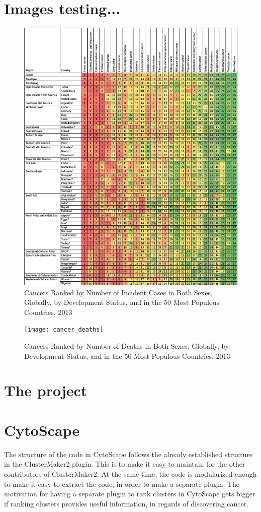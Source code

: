 \documentclass[UKenglish]{ifimaster}
\begin{document}
\part{Images testing...}
\begin{figure}[h]
    \caption{Cancers Ranked by Number of Incident Cases in Both Sexes, Globally, by Development Status, and in the 50
            Most Populous Countries, 2013}
    \includegraphics{cancer_incidents}
\end{figure}

\begin{figure}[h]
    \caption{Cancers Ranked by Number of Deaths in Both Sexes, Globally, by Development Status, and in the 50 Most
            Populous Countries, 2013}
    \texttt{[image: cancer\_deaths]}
\end{figure}

\part{The project}
\part{CytoScape} %
The structure of the code in CytoScape follows the already established structure in the ClusterMaker2 plugin. This is to
make it easy to maintain for the other contributors of ClusterMaker2. At the same time, the code is modularized enough
to make it easy to extract the code, in order to make a separate plugin. The motivation for having a separate plugin to
rank clusters in CytoScape gets bigger if ranking clusters provides useful information, in regards of discovering
cancer.
\end{document}
